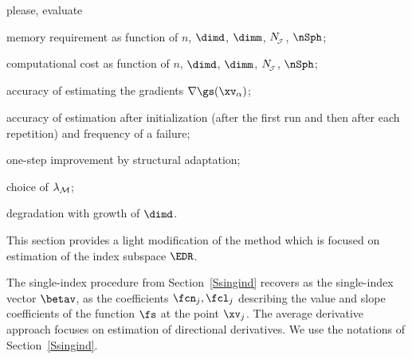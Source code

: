 {\color{blue} please, evaluate
\begin{mylist}

	\item 
	memory requirement as function of \( n \), \( \dimd \), \( \dimm \), \( N_{\!_{\mathcal{J}}} \), \( \nSph \);
	\item
	computational cost as function of \( n \), \( \dimd \), \( \dimm \), \( N_{\!_{\mathcal{J}}} \), \( \nSph \);
	\item
	accuracy of estimating the gradients \( \nabla \gs(\xv_{\jl}) \);
	\item
	accuracy of estimation after initialization (after the first run and then after each repetition)
	and frequency of a failure;
	\item
	one-step improvement by structural adaptation;
	\item
	choice of \( \lambda_{\mathcal{M}} \);
	\item
	degradation with growth of \( \dimd \).
\end{mylist}

}


\label{Saverder}

%
This section provides a light modification of the method 
which is focused on estimation of the index subspace \( \EDR \).


\label{Saverdersi}
The single-index procedure from Section~\ref{Ssingind} recovers 
as the single-index vector \( \betav \), as the coefficients \( \fcn_{j}, \fcl_{j} \)
describing the value and slope coefficients of the function \( \fs \) at the point \( \xv_{j} \).
The average derivative approach focuses on estimation of directional derivatives. 
We use the notations of Section~\ref{Ssingind}.

